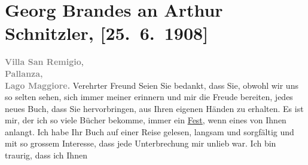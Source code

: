 

         \renewcommand{\erwaehnteOrte}{Orte: Pallanza, Seis am Schlern, Villa San Remigio, Wien, Österreich}
         \renewcommand{\erwaehnteWerke}{Werke: Der Weg ins Freie. Roman}
               \section[Georg Brandes an Arthur Schnitzler, {[}25. 6. 1908{]}]{ Georg Brandes an Arthur Schnitzler, {[}25. 6. 1908{]}}\nopagebreak{}\rehead{ }\begin{ledgroupsized}[t]{13cm}\normalsize\beginnumbering \toendnotes[C]{\smallbreak\pagebreak[2]} 
\toendnotes[C]{\smallbreak}\pstart
           \noindent{}{\pb}\textcolor{gray}{\textbf{Villa San Remigio}}, {\\}\textcolor{gray}{\textbf{Pallanza,}}{\\}\textcolor{gray}{\textbf{Lago Maggiore.}}\pend
           \pstart{}Verehrter Freund\pend\pstart
           Seien Sie bedankt, dass Sie, obwohl wir uns so selten sehen, sich immer meiner
               erinnern und mir die Freude bereiten, jedes neues Buch, dass Sie hervorbringen, aus
               Ihren eigenen Händen zu erhalten. Es ist mir, der ich so viele Bücher bekomme, immer
               ein \uline{Fest}, wenn eines von Ihnen anlangt.\pend
           \pstart
           Ich habe Ihr Buch auf einer
               Reise gelesen, langsam und sorgfältig und mit so grossem Interesse, dass jede
               Unterbrechung mir unlieb war.\pend
           \pstart
           {\pb}Ich bin traurig, dass ich Ihnen

\end{ledgroupsized}
